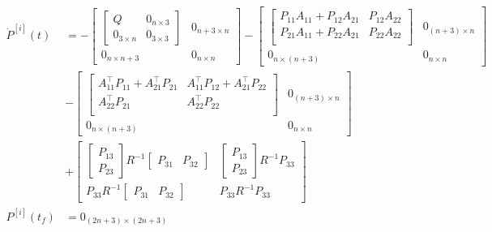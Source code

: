 \documentclass[3p,times]{article}
\begin{document}
\begin{align}
\dot{P}^{[i]}(t) &= -\begin{bmatrix}
\begin{bmatrix} Q & 0_{n\times 3} \\ 0_{3\times n} & 0_{3 \times 3}\end{bmatrix} & 0_{n+3\times n} \\ 0_{n\times n+3} & 0_{n\times n}
\end{bmatrix}
-\begin{bmatrix}\begin{bmatrix}
P_{11}A_{11} + P_{12}A_{21} & P_{12}A_{22} \\
P_{21}A_{11} + P_{22}A_{21} & P_{22}A_{22} \\
\end{bmatrix}   & 0_{(n+3)\times n} \\ 
0_{n \times (n+3)} & 0_{n \times n}\end{bmatrix} \\
&-\begin{bmatrix} \begin{bmatrix}
A_{11}^\top P_{11} + A_{21}^\top P_{21} & A_{11}^\top P_{12} + A_{21}^\top P_{22} \\
A_{22}^\top P_{21} & A_{22}^\top P_{22} \\
\end{bmatrix}  & 0_{(n+3)\times n} \\ 
0_{n \times (n+3)} & 0_{n \times n}\end{bmatrix}\\ 
&+\begin{bmatrix}
\begin{bmatrix}
P_{13} \\ P_{23}
\end{bmatrix}
R^{-1} 
\begin{bmatrix}
P_{31} & P_{32}
\end{bmatrix}
&
\begin{bmatrix}
P_{13} \\ P_{23}
\end{bmatrix}R^{-1} P_{33} \\
P_{33}R^{-1}\begin{bmatrix}
P_{31} & P_{32}
\end{bmatrix} & P_{33}R^{-1}P_{33}
\end{bmatrix}
\\
P^{[i]}(t_f) &= 0_{(2n+3)\times(2n+3)}
\end{align}
\end{document}
